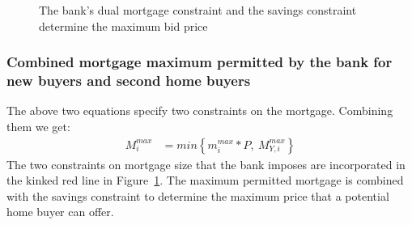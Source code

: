 {  \begin{figure}
    \centering
    
    \caption{The bank's dual mortgage constraint and the savings constraint determine the maximum bid price}
    \label{fig:dual-constraint}
    \end{figure}

\subsubsection{Combined mortgage maximum permitted by the bank for new buyers and second home buyers}

The above  two equations specify two constraints on the mortgage.  Combining them we get:
\begin{align} 
M_i^{max} &= min \left\{ m_i^{max}*P, \ M^{max}_{Y,i} \right\} 
\label{eqn-max-mortgage-combined}
\end{align}
The two constraints on  mortgage size that the bank imposes are incorporated in the kinked red line in Figure~\ref{fig:dual-constraint}. The maximum  permitted mortgage is combined with the savings constraint to determine the maximum price that a potential home buyer can offer.%




% 






}
